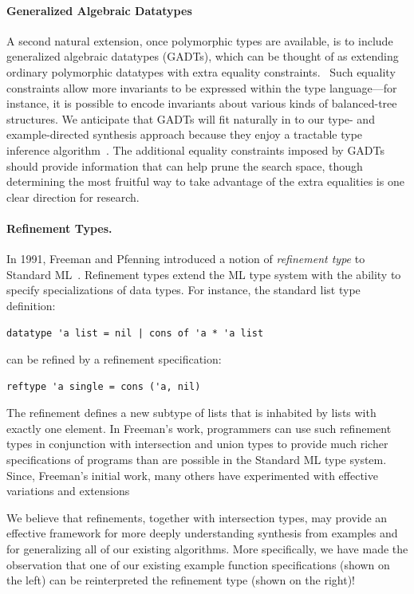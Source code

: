 \paragraph*{Generalized Algebraic Datatypes}

A second natural extension, once polymorphic types are available, is
to include generalized algebraic datatypes (GADTs), which can be
thought of as extending ordinary polymorphic datatypes with extra
equality constraints.~\cite{middelkoop2010lean} Such equality
constraints allow more invariants to be expressed within the type
language---for instance, it is possible to encode invariants about
various kinds of balanced-tree structures.  
We anticipate that GADTs
will fit naturally in to our type- and example-directed synthesis
approach because they enjoy a tractable type inference
algorithm~\cite{schrijvers2009complete}. The additional equality
constraints imposed by GADTs should provide information that can help
prune the search space, though determining the most fruitful way to
take advantage of the extra equalities is one clear direction for
research. 

\paragraph*{Refinement Types.}
In 1991, Freeman and Pfenning introduced a notion of \emph{refinement type}
to Standard ML~\cite{freeman:refinement-types}.  Refinement types extend
the ML type system with the ability to specify specializations of data
types.  For instance, the standard list type definition:
\begin{verbatim}
datatype 'a list = nil | cons of 'a * 'a list
\end{verbatim}
can be refined by a refinement specification:
\begin{verbatim}
reftype 'a single = cons ('a, nil)
\end{verbatim}
The refinement defines a new subtype of lists that is inhabited
by lists with exactly one element.  In Freeman's work,
programmers can use such refinement
types in conjunction with intersection and union types to provide
much richer specifications of programs than are possible in 
the Standard ML type system.  Since, Freeman's initial work,
many others have experimented
with effective variations and extensions~\cite{pfenning:refine-logic-frameworks,davies:refinement-checker,davies:refine-checking,vazou:abstract-refinements}

We believe that refinements, together with intersection types,
may provide an effective framework for more deeply understanding
synthesis from examples and for generalizing all of our existing
algorithms.  More specifically, we have made the observation 
that one of our existing 
example function specifications (shown on the left)  can be
reinterpreted the refinement type (shown on the right)!

